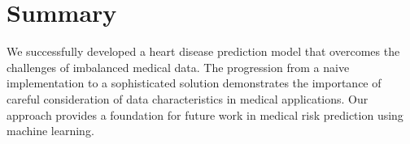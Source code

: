 \documentclass[10pt,conference,compsocconf]{IEEEtran}
\begin{document}
\section{Summary}

We successfully developed a heart disease prediction model that overcomes the challenges of
imbalanced medical data. The progression from a naive implementation to a sophisticated solution
demonstrates the importance of careful consideration of data characteristics in medical
applications. Our approach provides a foundation for future work in medical risk
prediction using machine learning.
\end{document}
